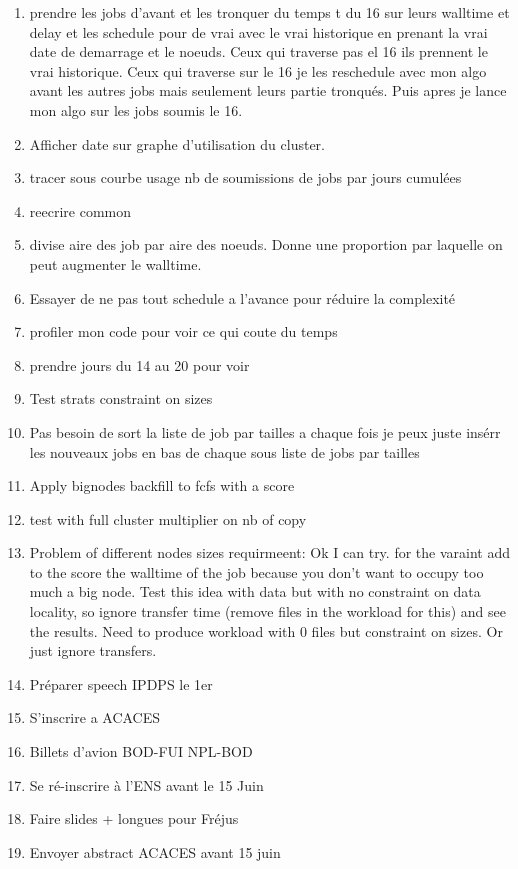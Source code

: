 \documentclass[a4paper]{article}
\begin{document}
\begin{enumerate}
			\item prendre les jobs d'avant et les tronquer du temps t du 16 sur leurs walltime et delay et les schedule pour de vrai avec le vrai historique en prenant la vrai date de demarrage et le noeuds. Ceux qui traverse pas el 16 ils prennent le vrai historique. Ceux qui traverse sur le 16 je les reschedule avec mon algo avant les autres jobs mais seulement leurs partie tronqués. Puis apres je lance mon algo sur les jobs soumis le 16.
			\item Afficher date sur graphe d'utilisation du cluster.
			\item tracer sous courbe usage nb de soumissions de jobs par jours cumulées
			\item reecrire common
			\item divise aire des job par aire des noeuds. Donne une proportion par laquelle on peut augmenter le walltime.
			\item Essayer de ne pas tout schedule a l'avance pour réduire la complexité
			\item profiler mon code pour voir ce qui coute du temps
			\item prendre jours du 14 au 20 pour voir
			\item Test strats constraint on sizes
			\item Pas besoin de sort la liste de job par tailles a chaque fois je peux juste insérr les nouveaux jobs en bas de chaque sous liste de jobs par tailles
			\item Apply bignodes backfill to fcfs with a score
			\item test with full cluster multiplier on nb of copy
			\item Problem of different nodes sizes requirmeent: Ok I can try. for the varaint add to the score the walltime of the job because you don't want to occupy too much a big node. Test this idea with data but with no constraint on data locality, so ignore transfer time (remove files in the workload for this) and see the results. Need to produce workload with 0 files but constraint on sizes. Or just ignore transfers.
			\item Préparer speech IPDPS le 1er
			\item S'inscrire a ACACES
			\item Billets d'avion BOD-FUI NPL-BOD
			\item Se ré-inscrire à l'ENS avant le 15 Juin
			\item Faire slides + longues pour Fréjus
			\item Envoyer abstract ACACES avant 15 juin

\end{enumerate}
\end{document}
